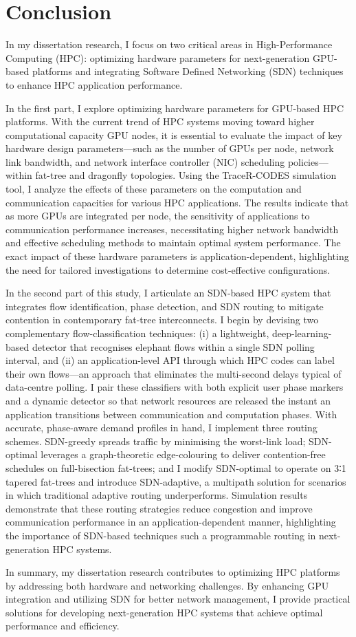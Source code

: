 \chapter{Conclusion}
In my dissertation research, I focus on two critical areas in High-Performance Computing (HPC): optimizing hardware parameters for next-generation GPU-based platforms and integrating Software Defined Networking (SDN) techniques to enhance HPC application performance.

In the first part, I explore optimizing hardware parameters for GPU-based HPC platforms. With the current trend of HPC systems moving toward higher computational capacity GPU nodes, it is essential to evaluate the impact of key hardware design parameters—such as the number of GPUs per node, network link bandwidth, and network interface controller (NIC) scheduling policies—within fat-tree and dragonfly topologies. Using the TraceR-CODES simulation tool, I analyze the effects of these parameters on the computation and communication capacities for various HPC applications. The results indicate that as more GPUs are integrated per node, the sensitivity of applications to communication performance increases, necessitating higher network bandwidth and effective scheduling methods to maintain optimal system performance. The exact impact of these hardware parameters is application-dependent, highlighting the need for tailored investigations to determine cost-effective configurations.

In the second part of this study, I articulate an SDN-based HPC system that integrates flow identification, phase detection, and SDN routing to mitigate contention in contemporary fat-tree interconnects. I begin by devising two complementary flow-classification techniques: (i) a lightweight, deep-learning-based detector that recognises elephant flows within a single SDN polling interval, and (ii) an application-level API through which HPC codes can label their own flows—an approach that eliminates the multi-second delays typical of data-centre polling. I pair these classifiers with both explicit user phase markers and a dynamic detector so that network resources are released the instant an application transitions between communication and computation phases. With accurate, phase-aware demand profiles in hand, I implement three routing schemes. SDN-greedy spreads traffic by minimising the worst-link load; SDN-optimal leverages a graph-theoretic edge-colouring to deliver contention-free schedules on full-bisection fat-trees; and I modify SDN-optimal to operate on 3∶1 tapered fat-trees and introduce SDN-adaptive, a multipath solution for scenarios in which traditional adaptive routing underperforms. Simulation results demonstrate that these routing strategies reduce congestion and improve communication performance in an application-dependent manner, highlighting the importance of SDN-based techniques such a  programmable routing in next-generation HPC systems.

In summary, my dissertation research contributes to optimizing HPC platforms by addressing both hardware and networking challenges. By enhancing GPU integration and utilizing SDN for better network management, I provide practical solutions for developing next-generation HPC systems that achieve optimal performance and efficiency.
